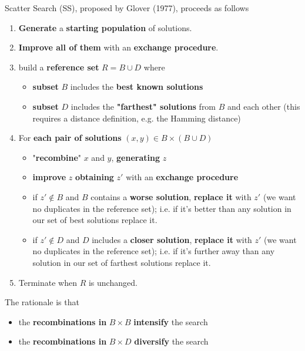 \documentclass[11pt]{article}
\begin{document}
	Scatter Search (SS), proposed by Glover (1977), proceeds as follows
	\begin{enumerate}
		\item \textbf{Generate} a \textbf{starting population} of solutions.\\
		
		\item \textbf{Improve all of them} with an \textbf{exchange procedure}.\\
		
		\item build a \textbf{reference set} $R = B \cup D$ where
		\begin{itemize}
			\item \textbf{subset} $B$ includes the \textbf{best known solutions}
			\item \textbf{subset} $D$ includes the \textbf{"farthest" solutions} from $B$ and each other (this requires a distance definition, e.g. the Hamming distance)
		\end{itemize}
		\nn
		
		\item For \textbf{each pair of solutions} $(x, y ) \in B \times (B \cup D)$
		\begin{itemize}
			\item "\textbf{recombine}" $x$ and $y$, \textbf{generating} $z$
			
			\item \textbf{improve} $z$ \textbf{obtaining} $z'$ with an \textbf{exchange procedure}
			
			\item if $z' \notin B$ and $B$ contains a \textbf{worse solution}, \textbf{replace it} with $z'$ (we want no duplicates in the reference set); i.e. if it's better than any solution in our set of best solutions replace it.
			
			\item if $z' \notin D$ and $D$ includes a \textbf{closer solution}, \textbf{replace it} with $z'$ (we want no duplicates in the reference set); i.e. if it's further away than any solution in our set of farthest solutions replace it.
		\end{itemize}
		\nn
		
		\item Terminate when $R$ is unchanged.\\
	\end{enumerate}
	
	The rationale is that
	\begin{itemize}
		\item the \textbf{recombinations in} $B \times B$ \textbf{intensify} the search
		
		\item the \textbf{recombinations in} $B \times D$ \textbf{diversify} the search
	\end{itemize}
	
\end{document}
